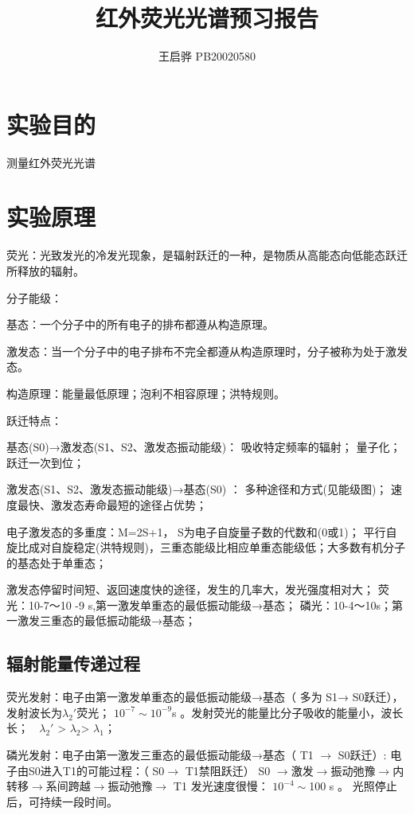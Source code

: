 \documentclass{article}
\title{\songti \zihao{2}\bfseries 红外荧光光谱预习报告}
\author{王启骅 PB20020580}
\begin{document}
	\maketitle
	\section{实验目的}
	测量红外荧光光谱
	\section{实验原理}
	荧光：光致发光的冷发光现象，是辐射跃迁的一种，是物质从高能态向低能态跃迁所释放的辐射。
	
	
	分子能级：
	
	
基态：一个分子中的所有电子的排布都遵从构造原理。


激发态：当一个分子中的电子排布不完全都遵从构造原理时，分子被称为处于激发态。


构造原理：能量最低原理；泡利不相容原理；洪特规则。


跃迁特点：


基态(S0)→激发态(S1、S2、激发态振动能级)：
	吸收特定频率的辐射；
	量子化；
	跃迁一次到位；
	
	
激发态(S1、S2、激发态振动能级)→基态(S0) ：
	多种途径和方式(见能级图)；
	速度最快、激发态寿命最短的途径占优势；
	
	
	电子激发态的多重度：M=2S+1，
   S为电子自旋量子数的代数和(0或1)；
平行自旋比成对自旋稳定(洪特规则)，三重态能级比相应单重态能级低；大多数有机分子的基态处于单重态；


激发态停留时间短、返回速度快的途径，发生的几率大，发光强度相对大；
荧光：10-7～10 -9 s,第一激发单重态的最低振动能级→基态；
磷光：10-4～10s；第一激发三重态的最低振动能级→基态；
 
\subsection{辐射能量传递过程}
荧光发射：电子由第一激发单重态的最低振动能级→基态（ 多为 S1→ S0跃迁），发射波长为$ \lambda_2' $荧光； $ 10^{-7}\sim 10^{-9} $s 。发射荧光的能量比分子吸收的能量小，波长长；  $ \lambda_2' $ > $ \lambda_2 $> $ \lambda_1 $；


 磷光发射：电子由第一激发三重态的最低振动能级→基态（ T1 $\rightarrow$ S0跃迁）:
         电子由S0进入T1的可能过程：（ S0$\rightarrow$ T1禁阻跃迁）
 S0 $\rightarrow$激发$\rightarrow$振动弛豫$\rightarrow$内转移$\rightarrow$系间跨越$\rightarrow$振动弛豫$\rightarrow$ T1
         发光速度很慢： $ 10^{-4}\sim $100 s 。 
        光照停止后，可持续一段时间。
\end{document}
